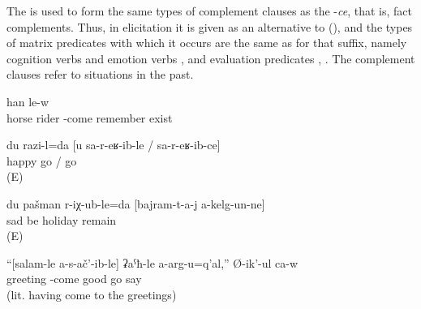 The  is used to form the same types of complement clauses as the  -\textit{ce}, that is, fact complements. Thus, in elicitation it is given as an alternative to  (), and the types of matrix predicates with which it occurs are the same as for that suffix, namely cognition verbs  and emotion verbs , and evaluation predicates , . The complement clauses refer to situations in the past.
%
\begin{exe}
	\ex	\label{ex:‎I remember that he came riding on a horse}
		han	le-w\\
			horse	rider	-come	remember	exist\\
	\glt	{}

	\ex	\label{ex:‎‎‎I am happy that you came preterite converb}
	\gll	du	razi-l=da	[u	sa-r-eʁ-ib-le	/	sa-r-eʁ-ib-ce]\\
			happy		go	/ go\\
	\glt	{} (E)

	\ex	\label{ex:‎‎‎I regret that I did not stay for the holidays}
	\gll	du	pašman	r-iχ-ub-le=da	[bajram-t-a-j	a-kelg-un-ne]\\
			sad	be	holiday	remain\\
	\glt	{} (E)


	\ex	\label{ex:‎‎‎He said that it is not good that he did not go to the meeting}
	\gll	``[salam-le	a-s-ač'-ib-le]	ʡaˁħ-le	a-arg-u=q'al,''	Ø-ik'-ul	ca-w\\
		greeting	-come	good	go	say	\\
	\glt	{} (lit. having come to the greetings)
	
\end{exe}

